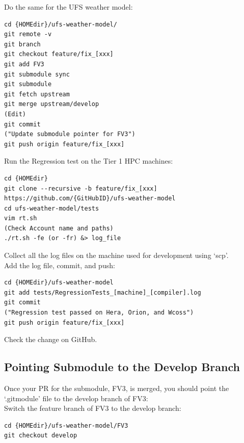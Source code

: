 \documentclass[11pt,fleqn]{report}              %
\begin{document}
\vspace{0.2cm}

Do the same for the UFS weather model:
\lstset{language=bash}   
\begin{lstlisting}[frame=trBL]
cd {HOMEdir}/ufs-weather-model/
git remote -v
git branch
git checkout feature/fix_[xxx]
git add FV3
git submodule sync
git submodule
git fetch upstream
git merge upstream/develop
(Edit)
git commit
("Update submodule pointer for FV3")
git push origin feature/fix_[xxx]
\end{lstlisting}

\vspace{0.2cm}

Run the Regression test on the Tier 1 HPC machines:
\lstset{language=bash}   
\begin{lstlisting}[frame=trBL]
cd {HOMEdir}
git clone --recursive -b feature/fix_[xxx] https://github.com/{GitHubID}/ufs-weather-model
cd ufs-weather-model/tests
vim rt.sh
(Check Account name and paths)
./rt.sh -fe (or -fr) &> log_file
\end{lstlisting}

\vspace{0.2cm}

Collect all the log files on the machine used for development using `scp'. \\

Add the log file, commit, and push:
\lstset{language=bash}   
\begin{lstlisting}[frame=trBL]
cd {HOMEdir}/ufs-weather-model
git add tests/RegressionTests_[machine]_[compiler].log
git commit
("Regression test passed on Hera, Orion, and Wcoss")
git push origin feature/fix_[xxx]
\end{lstlisting}

\vspace{0.2cm}

Check the change on GitHub.



\subsection{Pointing Submodule to the Develop Branch}

Once your PR for the submodule, FV3, is merged, you should point the `.gitmodule' file to the develop branch of FV3: \\

Switch the feature branch of FV3 to the develop branch:
\lstset{language=bash}   
\begin{lstlisting}[frame=trBL]
cd {HOMEdir}/ufs-weather-model/FV3
git checkout develop
\end{lstlisting}
\end{document}
